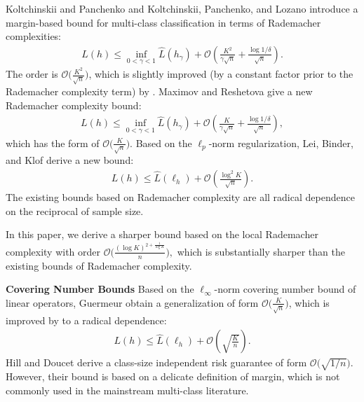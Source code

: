 \documentclass{article}
\begin{document}
Koltchinskii and Panchenko 
and Koltchinskii, Panchenko, and Lozano 
introduce a margin-based bound for multi-class classification in terms of Rademacher complexities:
\begin{align*}
  L(h)\leq \inf_{0<\gamma<1}\hat{L}(h_\gamma)+\mathcal{O}\left(\frac{K^2}{\gamma\sqrt{n}}+\frac{\log1/\delta}{\sqrt{n}}\right).
\end{align*}
The order is $\mathcal{O}\big(\frac{K^2}{\sqrt{n}}\big)$,
which is slightly improved (by a constant factor prior to the Rademacher complexity term)
by \cite{mohri2012foundations,cortes2013multi}.
Maximov and Reshetova  give a new Rademacher complexity bound:
\begin{align*}
  L(h)\leq \inf_{0<\gamma<1}\hat{L}(h_\gamma)+\mathcal{O}
  \left(\frac{K}{\gamma\sqrt{n}}+\frac{\log1/\delta}{\sqrt{n}}\right),
\end{align*}
which has the form of $\mathcal{O}\big(\frac{K}{\sqrt{n}}\big)$.
Based on the $\ell_p$-norm regularization,
Lei, Binder, and Klof  derive a new bound:
\begin{align*}
   L(h)\leq  \hat{L}(\ell_h) +\mathcal{O}\left(\frac{\log^2 K}{\sqrt{n}}\right).
\end{align*}
The existing bounds based on Rademacher complexity are all radical dependence
on the reciprocal of sample size.

In this paper,
we derive a sharper bound based on the local Rademacher complexity with order
$
\mathcal{O}\big(\frac{(\log K)^{2+\frac{1}{\log K}}}{n}\big),
$
which is substantially sharper
than the existing bounds of  Rademacher complexity.

\textbf{Covering Number Bounds}
Based on the $\ell_\infty$-norm covering number bound of
linear operators, Guermeur  obtain
a generalization of form $\mathcal{O}\big(\frac{K}{\sqrt{n}}\big)$,
which is improved by \cite{zhang2004statistical} to a radical dependence:
  \begin{align*}
   L(h)\leq  \hat{L}(\ell_h) +\mathcal{O}\left(\sqrt{\frac{K}{n}}\right).
\end{align*}
Hill and Doucet  derive a class-size independent risk guarantee
of form $\mathcal{O}\big(\sqrt{{1}/{n}}\big)$.
However, their bound is based on a delicate definition of margin,
which is not commonly  used in the mainstream multi-class literature.
\end{document}
